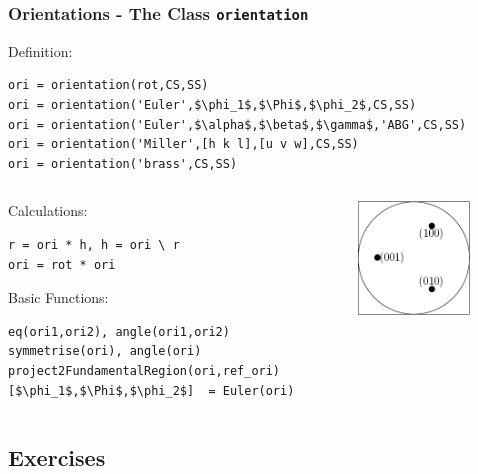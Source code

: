\begin{frame}[fragile]
  \frametitle{Orientations - The \MTEX Class \texttt{\bf orientation}}

Definition:

\begin{lstlisting}[mathescape=true]
ori = orientation(rot,CS,SS)
ori = orientation('Euler',$\phi_1$,$\Phi$,$\phi_2$,CS,SS)
ori = orientation('Euler',$\alpha$,$\beta$,$\gamma$,'ABG',CS,SS)
ori = orientation('Miller',[h k l],[u v w],CS,SS)
ori = orientation('brass',CS,SS)
\end{lstlisting}

\begin{columns}
  \begin{column}{8.5cm}

    Calculations:

\begin{lstlisting}
r = ori * h, h = ori \ r
ori = rot * ori
\end{lstlisting}

    Basic Functions:

\begin{lstlisting}[mathescape=true]
eq(ori1,ori2), angle(ori1,ori2)
symmetrise(ori), angle(ori)
project2FundamentalRegion(ori,ref_ori)
[$\phi_1$,$\Phi$,$\phi_2$]  = Euler(ori)
\end{lstlisting}

  \end{column}

  \begin{column}{3cm}
    \includegraphics[width=3cm]{pic/quaternion}
  \end{column}

\end{columns}
\end{frame}



\subsection*{Exercises}

